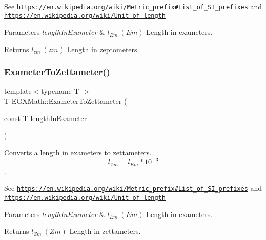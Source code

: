 See \href{https://en.wikipedia.org/wiki/Metric_prefix#List_of_SI_prefixes}{\tt https\+://en.\+wikipedia.\+org/wiki/\+Metric\+\_\+prefix\#\+List\+\_\+of\+\_\+\+S\+I\+\_\+prefixes} and \href{https://en.wikipedia.org/wiki/Unit_of_length}{\tt https\+://en.\+wikipedia.\+org/wiki/\+Unit\+\_\+of\+\_\+length} 
\begin{DoxyParams}{Parameters}
{\em length\+In\+Exameter} & $ l_{Em}\ (Em)$ Length in exameters. \\
\hline
\end{DoxyParams}
\begin{DoxyReturn}{Returns}
$ l_{zm}\ (zm)$ Length in zeptometers. 
\end{DoxyReturn}
\mbox{\label{group___e_g_x_math-_conversions-_length_conversions-_exameter-_s_i_gaa971cb3b6d17c5e7772d180b2606e42b}} 
\subsubsection{\texorpdfstring{Exameter\+To\+Zettameter()}{ExameterToZettameter()}}
{\footnotesize\ttfamily template$<$typename T $>$ \\
T E\+G\+X\+Math\+::\+Exameter\+To\+Zettameter (\begin{DoxyParamCaption}\item[{const T}]{length\+In\+Exameter }\end{DoxyParamCaption})}



Converts a length in exameters to zettameters. \[ l_{Zm}=l_{Em} * 10^{-3} \]. 

See \href{https://en.wikipedia.org/wiki/Metric_prefix#List_of_SI_prefixes}{\tt https\+://en.\+wikipedia.\+org/wiki/\+Metric\+\_\+prefix\#\+List\+\_\+of\+\_\+\+S\+I\+\_\+prefixes} and \href{https://en.wikipedia.org/wiki/Unit_of_length}{\tt https\+://en.\+wikipedia.\+org/wiki/\+Unit\+\_\+of\+\_\+length} 
\begin{DoxyParams}{Parameters}
{\em length\+In\+Exameter} & $ l_{Em}\ (Em)$ Length in exameters. \\
\hline
\end{DoxyParams}
\begin{DoxyReturn}{Returns}
$ l_{Zm}\ (Zm)$ Length in zettameters. 
\end{DoxyReturn}
